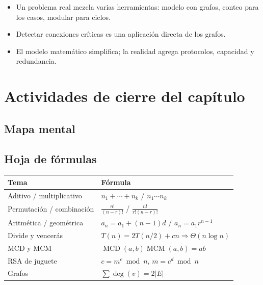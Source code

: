 
\begin{tmresumen}
\begin{itemize}
\item Un problema real mezcla varias herramientas: modelo con grafos, conteo para los casos, modular para ciclos.
\item Detectar conexiones cr\'iticas es una aplicaci\'on directa de los grafos.
\item El modelo matem\'atico simplifica; la realidad agrega protocolos, capacidad y redundancia.
\end{itemize}
\end{tmresumen}

\clearpage
\section{Actividades de cierre del cap\'itulo}
\label{sec:2-8}

\subsection{Mapa mental}

\subsection{Hoja de f\'ormulas}
\begin{center}
\begin{tabular}{|p{4.4cm}|p{8.2cm}|}
\hline
\rowcolor{tmAzulClaro}\textbf{Tema} & \textbf{F\'ormula}\\ \hline
Aditivo / multiplicativo & $n_1+\cdots+n_k$ \quad / \quad $n_1\cdots n_k$\\ \hline
Permutaci\'on / combinaci\'on & $\frac{n!}{(n-r)!}$ \quad / \quad $\frac{n!}{r!(n-r)!}$\\ \hline
Aritm\'etica / geom\'etrica & $a_n=a_1+(n-1)d$ \quad / \quad $a_n=a_1r^{n-1}$\\ \hline
Divide y vencer\'as & $T(n)=2T(n/2)+cn\Rightarrow\Theta(n\log n)$\\ \hline
MCD y MCM & $\operatorname{MCD}(a, b)\operatorname{MCM}(a, b)=ab$\\ \hline
RSA de juguete & $c=m^e\bmod n$, $m=c^d\bmod n$\\ \hline
Grafos & $\sum\deg(v)=2|E|$\\ \hline
\end{tabular}
\end{center}

